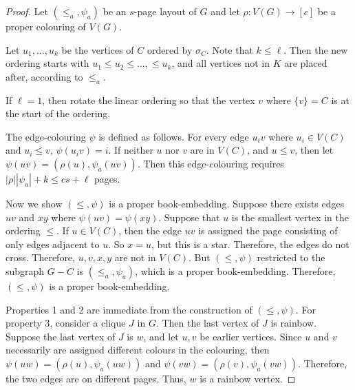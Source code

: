 \begin{proof}
	Let \((\leq_a, \psi_a)\) be an \(s\)-page layout of \(G\) and let \(\rho: V(G) \rightarrow [c]\) be a proper colouring of \(V(G)\).

	Let \(u_1, \ldots, u_k\) be the vertices of \(C\) ordered by \(\sigma_C\). Note that \(k \leq \ell\). Then the new ordering starts with \(u_1 \leq u_2 \leq \ldots, \leq u_k\), and all vertices not in \(K\) are placed after, according to \(\leq_a\).

	If $\ell = 1$, then rotate the linear ordering so that the vertex $v$ where $\{v\} = C$ is at the start of the ordering. 

	The edge-colouring \(\psi\) is defined as follows. For every edge \(u_i v\) where \(u_i \in V(C)\) and \(u_i \leq v\), \(\psi(u_i v) = i\). If neither \(u\) nor \(v\) are in \(V(C)\), and \(u \leq v\), then let \(\psi(uv) = (\rho(u), \psi_a(uv))\). Then this edge-colouring requires \(|\rho| |\psi_a| + k \leq cs + \ell\) pages.

	Now we show \((\leq, \psi)\) is a proper book-embedding. Suppose there exists edges \(uv\) and \(xy\) where \(\psi(uv) = \psi(xy)\). Suppose that \(u\) is the smallest vertex in the ordering \(\leq\). If \(u \in V(C)\), then the edge \(uv\) is assigned the page consisting of only edges adjacent to $u$. So \(x = u\), but this is a star. Therefore, the edges do not cross. Therefore, \(u, v, x, y\) are not in \(V(C)\). But \((\leq, \psi)\) restricted to the subgraph $G - C$ is \((\leq_a, \psi_a)\), which is a proper book-embedding. Therefore, \((\leq, \psi)\) is a proper book-embedding.  

	Properties 1 and 2 are immediate from the construction of \((\leq, \psi)\). For property 3, consider a clique \(J\) in \(G\). Then the last vertex of \(J\) is rainbow. Suppose the last vertex of \(J\) is \(w\), and let \(u, v\) be earlier vertices. Since \(u\) and \(v\) necessarily are assigned different colours in the colouring, then \(\psi(uw) = (\rho(u), \psi_a(uw))\) and \(\psi(vw) = (\rho(v), \psi_a(vw))\). Therefore, the two edges are on different pages. Thus, \(w\) is a rainbow vertex.
\end{proof}

